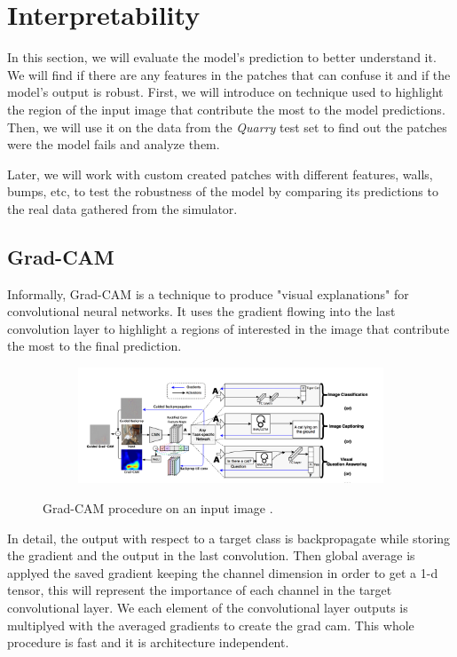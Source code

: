 \documentclass[../document.tex]{subfiles}
\begin{document}
\chapter{Interpretability}
In this section, we will evaluate the model's prediction to better understand it. We will find if there are any features in the patches that can confuse it and if the model's output is robust.
First, we will introduce on technique used to highlight the region of the input image that contribute the most to the model predictions. Then, we will use it on the data from the \emph{Quarry} test set to find out the patches were the model fails and analyze them.

Later, we will work with custom created patches with different features, walls, bumps, etc, to test the robustness of the model by comparing its predictions to the real data gathered from the simulator.

\section{Grad-CAM}
Informally, Grad-CAM \cite{gradcam} is a technique to produce "visual explanations" for convolutional neural networks. It uses the gradient flowing into the last convolution layer to highlight a regions of interested in the image that contribute the most to the final prediction. 

\begin{figure}[H]
    \centering
    \begin{subfigure}[b]{1\textwidth}
        \includegraphics[width=\linewidth]{../img/5/grad_cam1.png}
    \end{subfigure}
\caption{Grad-CAM procedure on an input image \cite{gradcam}.}
\end{figure}

In detail, the output with respect to a target class is backpropagate while storing the gradient and the output in the last convolution. Then global average is applyed the saved gradient keeping the channel dimension in order to get a 1-d tensor, this will represent the importance of each channel in the target convolutional layer. We  each element of the convolutional layer outputs is multiplyed with the averaged gradients to create the grad cam. This whole procedure is fast and it is architecture independent.



\end{document}
